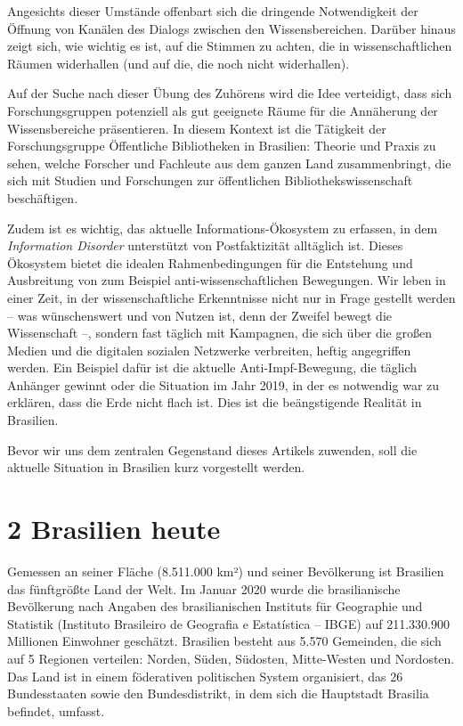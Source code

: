 \documentclass[a4paper,
fontsize=11pt,
oneside,
numbers=noperiodatend,
parskip=half-,
bibliography=totoc,
final
]{scrartcl}
\begin{document}
Angesichts dieser Umstände offenbart sich die dringende Notwendigkeit
der Öffnung von Kanälen des Dialogs zwischen den Wissensbereichen.
Darüber hinaus zeigt sich, wie wichtig es ist, auf die Stimmen zu
achten, die in wissenschaftlichen Räumen widerhallen (und auf die, die
noch nicht widerhallen).

Auf der Suche nach dieser Übung des Zuhörens wird die Idee verteidigt,
dass sich Forschungsgruppen potenziell als gut geeignete Räume für die
Annäherung der Wissensbereiche präsentieren. In diesem Kontext ist die
Tätigkeit der Forschungsgruppe Öffentliche Bibliotheken in Brasilien:
Theorie und Praxis zu sehen, welche Forscher und Fachleute aus dem
ganzen Land zusammenbringt, die sich mit Studien und Forschungen zur
öffentlichen Bibliothekswissenschaft beschäftigen.

Zudem ist es wichtig, das aktuelle Informations-Ökosystem zu erfassen,
in dem \emph{Information Disorder} unterstützt von Postfaktizität
alltäglich ist. Dieses Ökosystem bietet die idealen Rahmenbedingungen
für die Entstehung und Ausbreitung von zum Beispiel
anti-wissenschaftlichen Bewegungen. Wir leben in einer Zeit, in der
wissenschaftliche Erkenntnisse nicht nur in Frage gestellt werden -- was
wünschenswert und von Nutzen ist, denn der Zweifel bewegt die
Wissenschaft --, sondern fast täglich mit Kampagnen, die sich über die
großen Medien und die digitalen sozialen Netzwerke verbreiten, heftig
angegriffen werden. Ein Beispiel dafür ist die aktuelle
Anti-Impf-Bewegung, die täglich Anhänger gewinnt oder die Situation im
Jahr 2019, in der es notwendig war zu erklären, dass die Erde nicht
flach ist. Dies ist die beängstigende Realität in Brasilien.

Bevor wir uns dem zentralen Gegenstand dieses Artikels zuwenden, soll
die aktuelle Situation in Brasilien kurz vorgestellt werden.

\hypertarget{brasilien-heute}{%
\section{2 Brasilien heute}\label{brasilien-heute}}

Gemessen an seiner Fläche (8.511.000 km²) und seiner Bevölkerung ist
Brasilien das fünftgrößte Land der Welt. Im Januar 2020 wurde die
brasilianische Bevölkerung nach Angaben des brasilianischen Instituts
für Geographie und Statistik (Instituto Brasileiro de Geografia e
Estatística -- IBGE) auf 211.330.900 Millionen Einwohner geschätzt.
Brasilien besteht aus 5.570 Gemeinden, die sich auf 5 Regionen
verteilen: Norden, Süden, Südosten, Mitte-Westen und Nordosten. Das Land
ist in einem föderativen politischen System organisiert, das 26
Bundesstaaten sowie den Bundesdistrikt, in dem sich die Hauptstadt
Brasilia befindet, umfasst.
\end{document}
